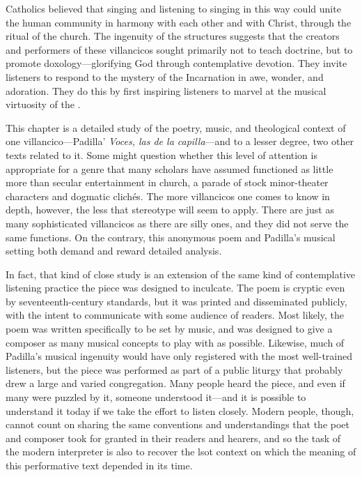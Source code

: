 Catholics believed that singing and listening to singing in this way could unite
the human community in harmony with each other and with Christ, through the
ritual of the church.
The ingenuity of the structures suggests that the creators and performers of
these villancicos sought primarily not to teach doctrine, but to promote
doxology---glorifying God through contemplative devotion.
They invite listeners to respond to the mystery of the Incarnation in awe,
wonder, and adoration. 
They do this by first inspiring listeners to marvel at the musical virtuosity of
the .

This chapter is a detailed study of the poetry, music, and theological context
of one villancico---Padilla' \emph{Voces, las de la capilla}---and to a lesser
degree, two other texts related to it.
Some might question whether this level of attention is appropriate for a genre
that many scholars have assumed functioned as little more than secular
entertainment in church, a parade of stock minor-theater characters and
dogmatic clichés.
The more villancicos one comes to know in depth, however, the less that
stereotype will seem to apply.
There are just as many sophisticated villancicos as there are silly ones, and
they did not serve the same functions.
On the contrary, this anonymous poem and Padilla's musical setting both demand
and reward detailed analysis.

In fact, that kind of close study is an extension of the same kind of
contemplative listening practice the piece was designed to inculcate.
The poem is cryptic even by seventeenth-century standards, but it was printed
and disseminated publicly, with the intent to communicate with some audience of
readers.
Most likely, the poem was written specifically to be set by music, and was
designed to give a composer as many musical concepts to play with as possible.
Likewise, much of Padilla's musical ingenuity would have only registered with
the most well-trained listeners, but the piece was performed as part of a public
liturgy that probably drew a large and varied congregation.
Many people heard the piece, and even if many were puzzled by it, someone
understood it---and it is possible to understand it today if we take the effort
to listen closely.
Modern people, though, cannot count on sharing the same conventions and
understandings that the poet and composer took for granted in their readers and
hearers, and so the task of the modern interpreter is also to recover the lsot
context on which the meaning of this performative text depended in its time.

